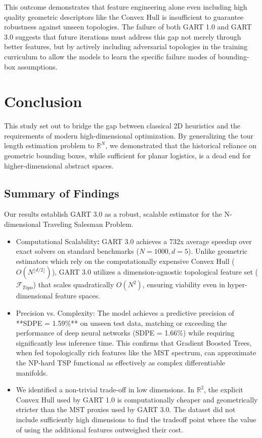\documentclass{article}
\begin{document}
This outcome demonstrates that feature engineering alone even including high quality geometric descriptors like the Convex Hull is insufficient to guarantee robustness against unseen topologies. The failure of both GART 1.0 and GART 3.0 suggests that future iterations must address this gap not merely through better features, but by actively including adversarial topologies in the training curriculum to allow the models to learn the specific failure modes of bounding-box assumptions.
\section{Conclusion}
\label{sec:conclusion}

This study set out to bridge the gap between classical 2D heuristics and the requirements of modern high-dimensional optimization. By generalizing the tour length estimation problem to $\mathbb{R}^N$, we demonstrated that the historical reliance on geometric bounding boxes, while sufficient for planar logistics, is a dead end for higher-dimensional abstract spaces.

\subsection{Summary of Findings}
Our results establish GART 3.0 as a robust, scalable estimator for the N-dimensional Traveling Salesman Problem.
\begin{itemize}
    \item Computational Scalability\textbf{:} GART 3.0 achieves a 732x average speedup over exact solvers on standard benchmarks ($N=1000, d=5$). Unlike geometric estimators which rely on the computationally expensive Convex Hull ($O(N^{\lfloor d/2 \rfloor})$), GART 3.0 utilizes a dimension-agnostic topological feature set ($\mathcal{F}_{Topo}$) that scales quadratically $O(N^2)$, ensuring viability even in hyper-dimensional feature spaces.
    \item Precision vs. Complexity: The model achieves a predictive precision of **SDPE = 1.59\%** on unseen test data, matching or exceeding the performance of deep neural networks (SDPE = 1.66\%) while requiring significantly less inference time. This confirms that Gradient Boosted Trees, when fed topologically rich features like the MST spectrum, can approximate the NP-hard TSP functional as effectively as complex differentiable manifolds.
    \item We identified a non-trivial trade-off in low dimensions. In $\mathbb{R}^2$, the explicit Convex Hull used by GART 1.0 is computationally cheaper and geometrically stricter than the MST proxies used by GART 3.0. The dataset did not include sufficiently high dimensions to find the tradeoff point where the value of using the additional features outweighed their cost.
\end{itemize}
\end{document}
